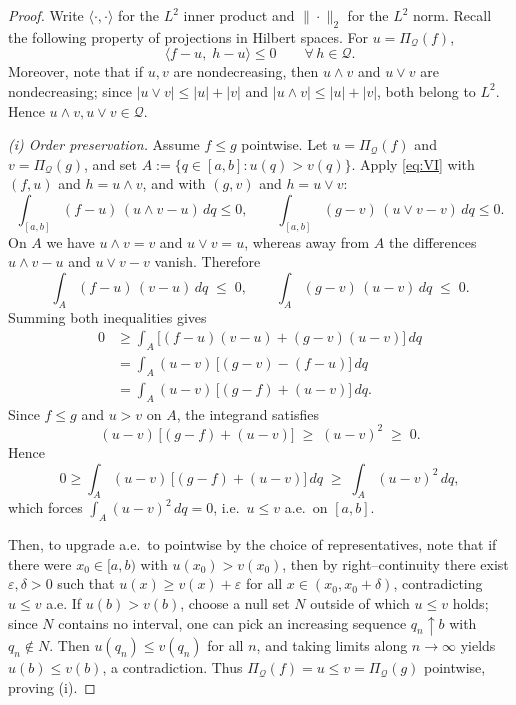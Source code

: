 \documentclass[12pt]{article}
\begin{document}
\begin{proof}
Write $\langle \cdot,\cdot\rangle$ for the $L^2$ inner product and $\|\cdot\|_2$ for the $L^2$ norm.
Recall the following property of projections in Hilbert spaces. For  $u=\Pi_{\mathcal Q}(f)$,
\begin{equation}\label{eq:VI}
\langle f-u,\;h-u\rangle \le 0\qquad\forall\,h\in\mathcal Q.
\end{equation}
Moreover, note that if $u,v$ are nondecreasing, then $u\wedge v$ and $u\vee v$ are nondecreasing; since
$|u\vee v|\le |u|+|v|$ and $|u\wedge v|\le |u|+|v|$, both belong to $L^2$.
Hence $u\wedge v, u\vee v\in\mathcal Q$.

\smallskip
\noindent\emph{(i) Order preservation.}
Assume $f\le g$ pointwise.
Let $u=\Pi_{\mathcal Q}(f)$ and $v=\Pi_{\mathcal Q}(g)$, and set $A:=\{q\in[a,b]: u(q)>v(q)\}$.
Apply \eqref{eq:VI} with $(f,u)$ and $h=u\wedge v$, and with $(g,v)$ and $h=u\vee v$:
\[
\int_{[a,b]} (f-u)\,(u\wedge v-u)\,dq\le 0,
\qquad
\int_{[a,b]} (g-v)\,(u\vee v-v)\,dq\le 0.
\]
On $A$ we have $u\wedge v=v$ and $u\vee v=u$, whereas away from $A$ the differences $u\wedge v-u$ and $u\vee v-v$ vanish.
Therefore
\[
\int_A (f-u)\,(v-u)\,dq \;\le\; 0,
\qquad
\int_A (g-v)\,(u-v)\,dq \;\le\; 0.
\]
Summing both inequalities gives
\begin{align*}
0
&\ge \int_A \big[(f-u)(v-u) + (g-v)(u-v)\big]\,dq \\
&= \int_A (u-v)\,\big[(g-v)-(f-u)\big]\,dq \\
&= \int_A (u-v)\,\big[(g-f)+(u-v)\big]\,dq.
\end{align*}
Since $f\le g$ and $u>v$ on $A$, the integrand satisfies
\[
(u-v)\,\big[(g-f)+(u-v)\big] \;\ge\; (u-v)^2 \;\ge\; 0.
\]
Hence
\[
0 \ge \int_A (u-v)\,\big[(g-f)+(u-v)\big]\,dq \;\ge\; \int_A (u-v)^2\,dq,
\]
which forces $\int_A (u-v)^2\,dq=0$, i.e.\ $u\le v$ a.e.\ on $[a,b]$.

Then, to upgrade a.e.\ to pointwise by the choice of representatives, note that if there were $x_0\in[a,b)$ with $u(x_0)>v(x_0)$, then by right–continuity there exist $\varepsilon,\delta>0$ such that
$u(x)\ge v(x)+\varepsilon$ for all $x\in(x_0,x_0+\delta)$, contradicting $u\le v$ a.e.
If $u(b)>v(b)$, choose a null set $N$ outside of which $u\le v$ holds; since $N$ contains no interval, one can pick an increasing sequence $q_n\uparrow b$ with $q_n\notin N$.
Then $u(q_n)\le v(q_n)$ for all $n$, and taking limits along $n\to\infty$ yields $u(b)\le v(b)$, a contradiction. Thus $\Pi_{\mathcal Q}(f)=u\le v=\Pi_{\mathcal Q}(g)$ pointwise, proving (i).


\end{proof}
\end{document}
